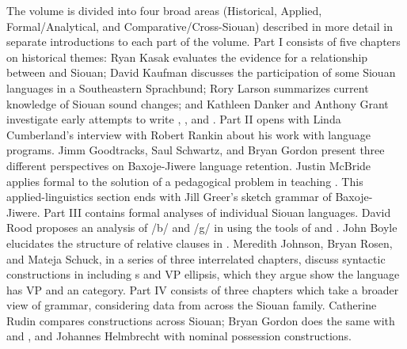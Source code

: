 \begin{refsection}
The volume is divided into four broad areas (Historical, Applied, Formal/Analy\-tical, and Comparative/Cross-Siouan) described in more detail in separate introductions to each part of the volume. Part I consists of five chapters on historical themes: Ryan Kasak evaluates the evidence for a relationship between  and Siouan; David Kaufman discusses the participation of some Siouan languages in a Southeastern Sprachbund; Rory Larson summarizes current knowledge of Siouan sound changes; and Kathleen Danker and Anthony Grant investigate early attempts to write , , and .  Part II opens with Linda Cumberland's interview with Robert Rankin about his work with  language programs. Jimm Goodtracks, Saul Schwartz, and Bryan Gordon present three different perspectives on Baxoje-Jiwere language retention. Justin McBride applies formal  to the solution of a pedagogical problem in teaching . This applied-linguistics section ends with Jill Greer's sketch grammar of Baxoje-Jiwere. Part III contains formal analyses of individual Siouan languages. David Rood proposes an analysis of /b/ and /g/ in  using the tools of  and . John Boyle elucidates the structure of relative clauses in . Meredith Johnson, Bryan Rosen, and Mateja Schuck, in a series of three interrelated chapters, discuss syntactic constructions in  including s and VP ellipsis, which they argue show the language has VP and an  category. Part IV consists of three chapters which take a broader view of grammar, considering data from across the Siouan family. Catherine Rudin compares  constructions across Siouan; Bryan Gordon does the same with  and , and Johannes Helmbrecht with nominal possession constructions. 
 


\end{refsection}

